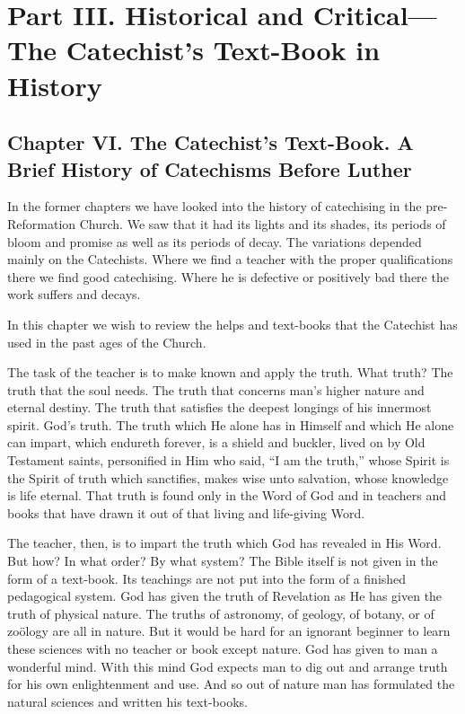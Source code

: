 \part[Part III. The Catechist’s Text-Book in History]{Part III. Historical and Critical—The Catechist’s Text-Book in History}

\chapter[Chapter VI. Catechisms Before Luther]{Chapter VI. The Catechist’s Text-Book. A Brief History of Catechisms Before Luther}

In the former chapters we have looked into the history of catechising in the pre-Reformation Church. We saw that it had its lights and its shades, its periods of bloom and promise as well as its periods of decay. The variations depended mainly on the Catechists. Where we find a teacher with the proper qualifications there we find good catechising. Where he is defective or positively bad there the work suffers and decays.

In this chapter we wish to review the helps and text-books that the Catechist has used in the past ages of the Church.

The task of the teacher is to make known and apply the truth. What truth? The truth that the soul needs. The truth that concerns man’s higher nature and eternal destiny. The truth that satisfies the deepest longings of his innermost spirit.  God’s truth. The truth which He alone has in Himself and which He alone can impart, which endureth forever, is a shield and buckler, lived on by Old Testament saints, personified in Him who said, “I am the truth,” whose Spirit is the Spirit of truth
which sanctifies, makes wise unto salvation, whose knowledge is life eternal. That truth is found only in the Word of God and in teachers and books that have drawn it out of that living and life-giving Word.

The teacher, then, is to impart the truth which God has revealed in His Word. But how? In what order? By what system? The Bible itself is not given in the form of a text-book. Its teachings are not put into the form of a finished pedagogical system. God has given the truth of Revelation as He has given the truth of physical nature. The truths of astronomy, of geology, of botany, or of zoölogy are all in nature. But it would be hard for an ignorant beginner to learn these sciences with no teacher or book except nature. God has given to man a wonderful mind. With this mind God expects man to dig out and arrange truth for his own enlightenment and use. And so out of nature man has formulated the natural sciences and written his text-books.


